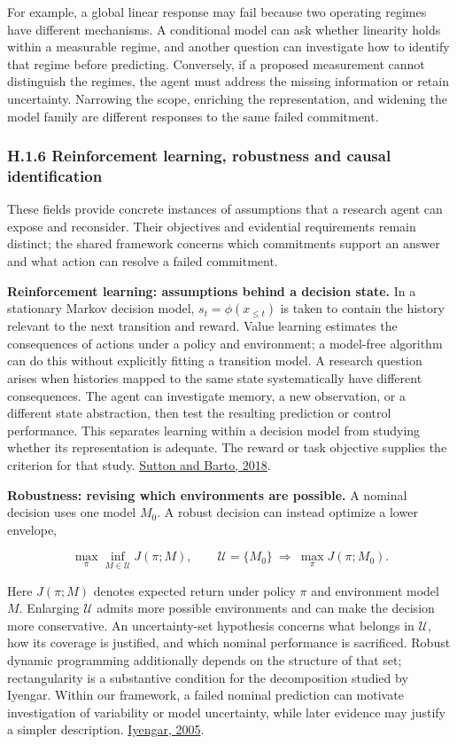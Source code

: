 \documentclass[twoside,11pt]{article}
\begin{document}
For example, a global linear response may fail because two operating regimes have different mechanisms. A conditional model can ask whether linearity holds within a measurable regime, and another question can investigate how to identify that regime before predicting. Conversely, if a proposed measurement cannot distinguish the regimes, the agent must address the missing information or retain uncertainty. Narrowing the scope, enriching the representation, and widening the model family are different responses to the same failed commitment.


\subsubsection*{H.1.6 Reinforcement learning, robustness and causal identification}

These fields provide concrete instances of assumptions that a research agent can expose and reconsider. Their objectives and evidential requirements remain distinct; the shared framework concerns which commitments support an answer and what action can resolve a failed commitment.


\textbf{Reinforcement learning: assumptions behind a decision state.} In a stationary Markov decision model, \(s_t=\phi(x_{\leq t})\) is taken to contain the history relevant to the next transition and reward. Value learning estimates the consequences of actions under a policy and environment; a model-free algorithm can do this without explicitly fitting a transition model. A research question arises when histories mapped to the same state systematically have different consequences. The agent can investigate memory, a new observation, or a different state abstraction, then test the resulting prediction or control performance. This separates learning within a decision model from studying whether its representation is adequate. The reward or task objective supplies the criterion for that study. \href{https://mitpress.mit.edu/9780262039246/reinforcement-learning/}{Sutton and Barto, 2018}.


\textbf{Robustness: revising which environments are possible.} A nominal decision uses one model \(M_0\). A robust decision can instead optimize a lower envelope,


\[
\max_\pi\inf_{M\in\mathcal U}J(\pi;M),
\qquad
\mathcal U=\{M_0\}\ \Longrightarrow\ \max_\pi J(\pi;M_0).
\]


Here \(J(\pi;M)\) denotes expected return under policy \(\pi\) and environment model \(M\). Enlarging \(\mathcal U\) admits more possible environments and can make the decision more conservative. An uncertainty-set hypothesis concerns what belongs in \(\mathcal U\), how its coverage is justified, and which nominal performance is sacrificed. Robust dynamic programming additionally depends on the structure of that set; rectangularity is a substantive condition for the decomposition studied by Iyengar. Within our framework, a failed nominal prediction can motivate investigation of variability or model uncertainty, while later evidence may justify a simpler description. \href{https://doi.org/10.1287/moor.1040.0129}{Iyengar, 2005}.
\end{document}
